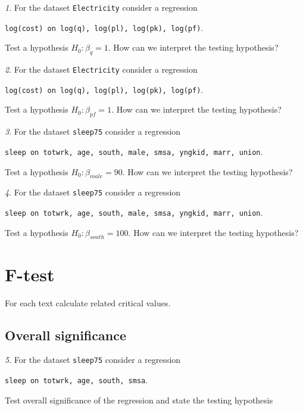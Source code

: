 \documentclass[12pt]{article}
\theoremstyle{remark}
\newtheorem{problem}{}[section]
\begin{document}
\begin{problem}
For the dataset \texttt{Electricity} consider a regression
\begin{center}
	\texttt{log(cost) on log(q), log(pl), log(pk), log(pf)}.
\end{center}
Test a hypothesis \(H_0:\beta_{q}=1\). How can we interpret 
the testing hypothesis?
\end{problem}

\begin{problem}
For the dataset \texttt{Electricity} consider a regression
\begin{center}
	\texttt{log(cost) on log(q), log(pl), log(pk), log(pf)}.
\end{center}
Test a hypothesis \(H_0:\beta_{pf}=1\). How can we interpret 
the testing hypothesis?
\end{problem}

\begin{problem}
For the dataset \texttt{sleep75} consider a regression
\begin{center}
	\texttt{sleep on totwrk, age, south, male, smsa, yngkid, marr, union}.
\end{center}
Test a hypothesis \(H_0:\beta_{male}=90\). How can we interpret 
the testing hypothesis?
\end{problem}

\begin{problem}
For the dataset \texttt{sleep75} consider a regression
\begin{center}
	\texttt{sleep on totwrk, age, south, male, smsa, yngkid, marr, union}.
\end{center}
Test a hypothesis \(H_0:\beta_{south}=100\). How can we interpret 
the testing hypothesis?
\end{problem}

\section{F-test}

For each text calculate related critical values.

\subsection{Overall significance}

\begin{problem}
For the dataset \texttt{sleep75} consider a regression
\begin{center}
	\texttt{sleep on totwrk, age, south, smsa}.
\end{center}
Test overall significance of the regression and state the testing hypothesis
\end{problem}
\end{document}

